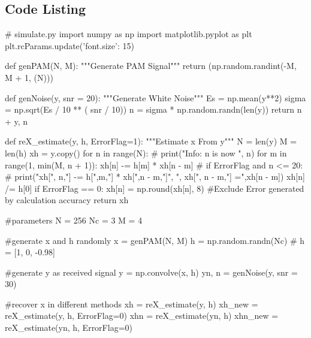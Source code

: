 \documentclass{article}
\begin{document}
\begin{appendices}






\section{Code Listing}
\begin{python}
# simulate.py
import numpy as np
import matplotlib.pyplot as plt
plt.rcParams.update({'font.size': 15})

def genPAM(N, M):
    """Generate PAM Signal"""
    return (np.random.randint(-M, M + 1, (N)))

def genNoise(y, snr = 20):
    """Generate White Noise"""
    Es = np.mean(y**2)
    sigma = np.sqrt(Es / 10 ** ( snr / 10))
    n = sigma * np.random.randn(len(y))
    return n + y, n

def reX_estimate(y, h, ErrorFlag=1):
    """Estimate x From y"""
    N = len(y)
    M = len(h)
    xh = y.copy()
    for n in range(N):
        # print("Info: n is now ", n)
        for m in range(1, min(M, n + 1)):
            xh[n] -= h[m] * xh[n - m]
            # if ErrorFlag and n <= 20:
            #     print("xh[", n,"] -= h[",m,"] * xh[",n - m,"]", ", xh[", n - m,"] =",xh[n - m])
        xh[n] /= h[0]
        if ErrorFlag == 0:
            xh[n] = np.round(xh[n], 8) #Exclude Error generated by calculation accuracy
    return xh

#parameters
N = 256
Nc = 3
M = 4

#generate x and h randomly
x = genPAM(N, M)
h = np.random.randn(Nc)
# h = [1, 0, -0.98]

#generate y as received signal
y = np.convolve(x, h)
yn, n = genNoise(y, snr = 30) 

#recover x in different methods
xh = reX_estimate(y, h)
xh_new = reX_estimate(y, h, ErrorFlag=0)
xhn = reX_estimate(yn, h)
xhn_new = reX_estimate(yn, h, ErrorFlag=0)


\end{python}
\end{appendices}
\end{document}
